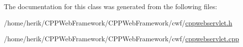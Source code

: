 The documentation for this class was generated from the following files\+:\begin{DoxyCompactItemize}
\item 
/home/herik/\+C\+P\+P\+Web\+Framework/\+C\+P\+P\+Web\+Framework/cwf/\hyperlink{cppwebservlet_8h}{cppwebservlet.\+h}\item 
/home/herik/\+C\+P\+P\+Web\+Framework/\+C\+P\+P\+Web\+Framework/cwf/\hyperlink{cppwebservlet_8cpp}{cppwebservlet.\+cpp}\end{DoxyCompactItemize}
